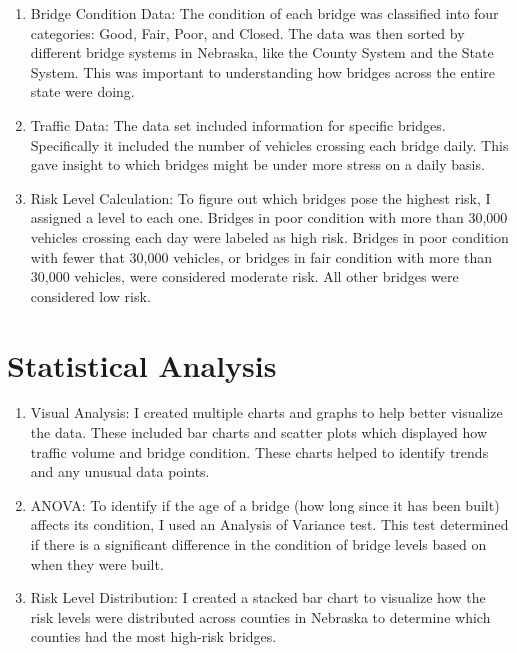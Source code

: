 \documentclass[
  letterpaper,
  DIV=11,
  numbers=noendperiod]{scrreprt}
\providecommand{\tightlist}{%
  \setlength{\itemsep}{0pt}\setlength{\parskip}{0pt}}\usepackage{longtable,booktabs,array}
\begin{document}
\begin{enumerate}
\def\labelenumi{\arabic{enumi}.}
\tightlist
\item
  Bridge Condition Data: The condition of each bridge was classified
  into four categories: Good, Fair, Poor, and Closed. The data was then
  sorted by different bridge systems in Nebraska, like the County System
  and the State System. This was important to understanding how bridges
  across the entire state were doing.
\item
  Traffic Data: The data set included information for specific bridges.
  Specifically it included the number of vehicles crossing each bridge
  daily. This gave insight to which bridges might be under more stress
  on a daily basis.
\item
  Risk Level Calculation: To figure out which bridges pose the highest
  risk, I assigned a level to each one. Bridges in poor condition with
  more than 30,000 vehicles crossing each day were labeled as high risk.
  Bridges in poor condition with fewer that 30,000 vehicles, or bridges
  in fair condition with more than 30,000 vehicles, were considered
  moderate risk. All other bridges were considered low risk.
\end{enumerate}

\section{Statistical Analysis}\label{statistical-analysis}

\begin{enumerate}
\def\labelenumi{\arabic{enumi}.}
\tightlist
\item
  Visual Analysis: I created multiple charts and graphs to help better
  visualize the data. These included bar charts and scatter plots which
  displayed how traffic volume and bridge condition. These charts helped
  to identify trends and any unusual data points.
\item
  ANOVA: To identify if the age of a bridge (how long since it has been
  built) affects its condition, I used an Analysis of Variance test.
  This test determined if there is a significant difference in the
  condition of bridge levels based on when they were built.
\item
  Risk Level Distribution: I created a stacked bar chart to visualize
  how the risk levels were distributed across counties in Nebraska to
  determine which counties had the most high-risk bridges.
\end{enumerate}
\end{document}
